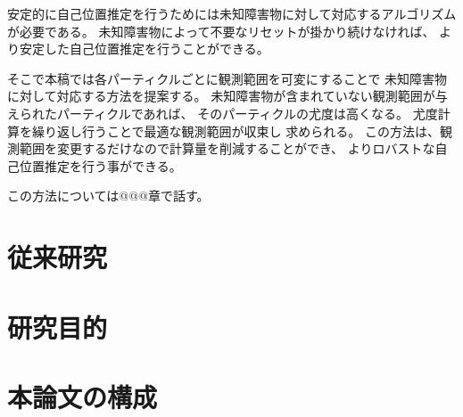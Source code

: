 安定的に自己位置推定を行うためには未知障害物に対して対応するアルゴリズムが必要である。
未知障害物によって不要なリセットが掛かり続けなければ、
より安定した自己位置推定を行うことができる。

そこで本稿では各パーティクルごとに観測範囲を可変にすることで
未知障害物に対して対応する方法を提案する。
未知障害物が含まれていない観測範囲が与えられたパーティクルであれば、
そのパーティクルの尤度は高くなる。
尤度計算を繰り返し行うことで最適な観測範囲が収束し
求められる。
この方法は、観測範囲を変更するだけなので計算量を削減することができ、
よりロバストな自己位置推定を行う事ができる。

この方法については@@@章で話す。

\section{従来研究}


\section{研究目的}


\section{本論文の構成}



%
